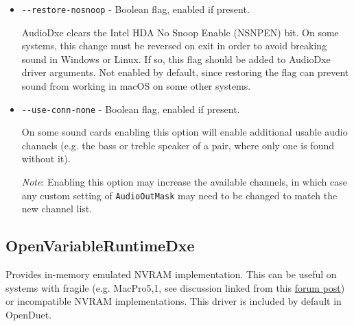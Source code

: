 \documentclass[]{article}
\begin{document}
\begin{itemize}
  When \texttt{-{}-gpio-setup} is enabled (i.e. non-zero), then \texttt{0} is a special
  value for \texttt{-{}-gpio-pins}, meaning that the pin mask will be auto-generated based on the
  reported number of GPIO pins on the specified codec (see \texttt{AudioCodec}), e.g. if the
  codec's audio out function group reports 4 GPIO pins, a mask of \texttt{0xF} will be used.
  The value in use can be seen in the debug log in a line such as: \medskip

  \texttt{HDA: GPIO setup on pins 0x0F - Success} \medskip

  Values for driver parameters can be specified in hexadecimal beginning with \texttt{0x} or
  in decimal, e.g. \texttt{-{}-gpio-pins=0x12} or \texttt{-{}-gpio-pins=18}. \medskip

  \item \texttt{-{}-restore-nosnoop} - Boolean flag, enabled if present. \medskip

  AudioDxe clears the Intel HDA No Snoop Enable (NSNPEN) bit. On some systems, this change must
  be reversed on exit in order to avoid breaking sound in Windows or Linux. If so, this flag should
  be added to AudioDxe driver arguments.
  Not enabled by default, since restoring the flag can prevent sound from working in macOS on
  some other systems. \medskip

  \item \texttt{-{}-use-conn-none} - Boolean flag, enabled if present. \medskip

  On some sound cards enabling this option will enable additional usable audio channels (e.g.
  the bass or treble speaker of a pair, where only one is found without it).
  \medskip

  \emph{Note}: Enabling this option may increase the available channels, in which case any
  custom setting of \texttt{AudioOutMask} may need to be changed to match the new channel list.
  \medskip
\end{itemize}

\subsection{OpenVariableRuntimeDxe}\label{emunvram}

Provides in-memory emulated NVRAM implementation. This can be useful on systems with fragile
(e.g. MacPro5,1, see discussion linked from this \href{https://forums.macrumors.com/posts/30945127}{forum post})
or incompatible NVRAM implementations. This driver is included by default in OpenDuet.
\end{document}

